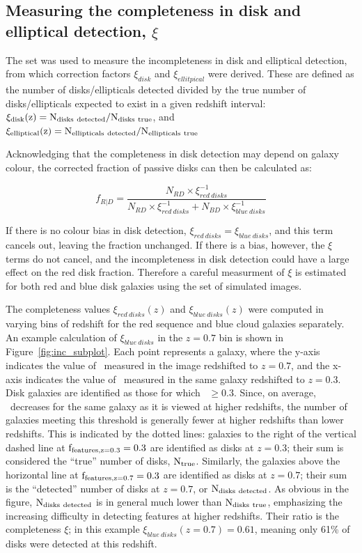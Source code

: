\documentclass[useAMS,usenatbib]{mn2e}
\begin{document}
\subsection{Measuring the completeness in disk and elliptical detection, $\xi$}
\label{ssec:xi}

The  set was used to measure the incompleteness in disk and elliptical detection, from which correction factors $\xi_{disk}$ and $\xi_{ellitpical}$ were derived. These are defined as the number of disks/ellipticals detected divided by the true number of disks/ellipticals expected to exist in a given redshift interval: $\rm \xi_{disk}(z)=N_{disks~detected}/N_{\rm disks~true}$, and $\rm \xi_{elliptical}(z)=N_{ellipticals~detected}/N_{ellipticals~true}$


 Acknowledging that the completeness in disk detection may depend on galaxy colour, the corrected fraction of passive disks can then be calculated as:

\begin{equation}
f_{R|D}=\frac{N_{RD}\times \xi^{-1}_{red~disks}}{N_{RD}\times \xi^{-1}_{red~disks} + N_{BD} \times \xi^{-1}_{blue~disks}}
\label{eqn:fdir}
\end{equation}

If there is no colour bias in disk detection, $\xi_{red~disks}=\xi_{blue~disks}$, and this term cancels out, leaving the fraction unchanged. If there is a bias, however, the $\xi$ terms do not cancel, and the incompleteness in disk detection could have a large effect on the red disk fraction. Therefore a careful measurment of $\xi$ is estimated for both red and blue disk galaxies using the  set of simulated images. 

The completeness values $\xi_{red~disks}(z)$ and $\xi_{blue~disks}(z)$ were computed in varying bins of redshift for the red sequence and blue cloud galaxies separately. An example calculation of $\xi_{blue~disks}$ in the $z=0.7$ bin is shown in Figure~\ref{fig:inc_subplot}. Each point represents a  galaxy, where the y-axis indicates the value of \ffeatures~measured in the image redshifted to $z=0.7$, and the x-axis indicates the value of \ffeatures~measured in the same galaxy redshifted to $z=0.3$. Disk galaxies are identified as those for which \ffeatures~$\ge0.3$. Since, on average, \ffeatures~decreases for the same galaxy as it is viewed at higher redshifts, the number of galaxies meeting this threshold is generally fewer at higher redshifts than lower redshifts. This is indicated by the dotted lines: galaxies to the right of the vertical dashed line at $\rm f_{features,z=0.3}=0.3$ are identified as disks at $z=0.3$; their sum is considered the ``true'' number of disks, $\rm N_{true}$. Similarly, the galaxies above the horizontal line at $\rm f_{features,z=0.7}=0.3$ are identified as disks at $z=0.7$; their sum is the ``detected'' number of disks at $z=0.7$, or $\rm N_{disks~detected}$. As obvious in the figure, $\rm N_{disks~detected}$ is in general much lower than $\rm N_{disks~true}$, emphasizing the increasing difficulty in detecting features at higher redshifts. Their ratio is the completeness $\xi$; in this example $\xi_{blue~disks}(z=0.7)=0.61$, meaning only 61\% of disks were detected at this redshift. 
\end{document}
